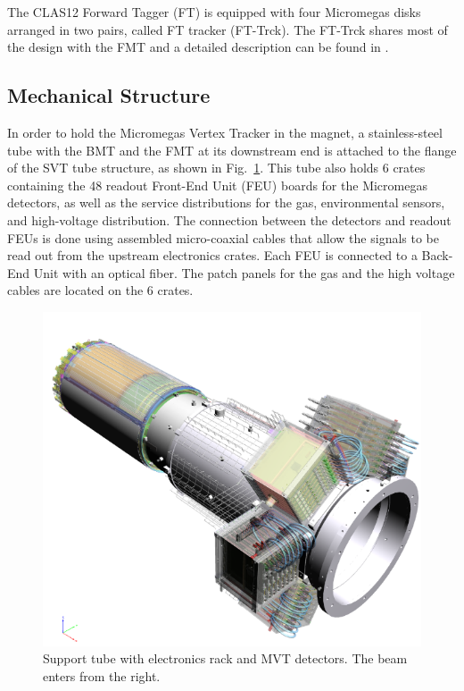The CLAS12 Forward Tagger (FT) is equipped with four Micromegas disks arranged in two pairs, called FT tracker 
(FT-Trck). The FT-Trck shares most of the design with the FMT and a detailed description can be found in \cite{ft-nim}.

\subsection{Mechanical Structure}

In order to hold the Micromegas Vertex Tracker in the magnet, a stainless-steel tube with the BMT and the FMT at its
downstream end is attached to the flange of the SVT tube structure, as shown in Fig.~\ref{fig:mm-fig2}. This tube also
holds 6 crates containing the 48 readout Front-End Unit (FEU) boards for the Micromegas detectors, as well as the service
distributions for the gas, environmental sensors, and high-voltage distribution. The connection between the detectors and
readout FEUs is done using assembled micro-coaxial cables that allow the signals to be read out from the upstream
electronics crates. Each FEU is connected to a Back-End Unit with an optical fiber. The patch panels for the gas and the high
voltage cables are located on the 6 crates.

\begin{figure}[htb]
 \includegraphics[width=1.0\columnwidth,keepaspectratio]{images/fig2}
 \caption{Support tube with electronics rack and MVT detectors. The beam enters from the right.}
 \label{fig:mm-fig2}
\end{figure}

